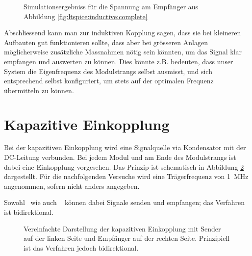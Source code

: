 
\begin{figure}[h!tb]
    
    \caption[Simulationsergebniss induktive Einkopplung bei Resonanz]{%
        Simulationsergebniss f\"ur die Spannung am Empf\"anger aus Abbildung
        \ref{fig:ltspice:inductive:complete}%
    }
    \label{fig:simu:inductive:resonance}
\end{figure}


Abschliessend kann man  zur induktiven Kopplung sagen, dass  sie bei kleineren
Aufbauten  gut  funktionieren  sollte,   dass  aber  bei  gr\"osseren  Anlagen
m\"oglicherweise  zus\"atzliche  Massnahmen  n\"otig sein  k\"onnten,  um  das
Signal klar empfangen und auswerten  zu k\"onnen. Dies k\"onnte z.B. bedeuten,
dass  unser System  die Eigenfrequenz  des Modulstrangs  selbst ausmisst,  und
sich entsprechend  selbst konfiguriert,  um stets  auf der  optimalen Frequenz
\"ubermitteln zu k\"onnen.


\clearpage
\section{Kapazitive Einkopplung}
\label{sec:simu:coupling:capacitive}

Bei der  kapazitiven Einkopplung  wird eine  Signalquelle via  Kondensator mit
der  DC-Leitung  verbunden. Bei  jedem  Modul und  am  Ende  des  Modulstrangs
ist   dabei  eine   Einkopplung   vorgesehen. Das   Prinzip  ist   schematisch
in   Abbildung   \ref{fig:circ:coupling:capacitive}   dargestellt. F\"ur   die
nachfolgenden  Versuche  wird  eine Tr\"agerfrequenz  von  \SI{1}{\mega\hertz}
angenommen, sofern nicht anders angegeben.

Sowohl \Master ~wie auch \Sensor~ k\"onnen dabei Signale senden und empfangen;
das Verfahren ist bidirektional.

\begin{figure}[h!tb]
    \centering
    
    \caption[Ersatzschaltbild kapazitive Einkopplung]{%
        Vereinfachte Darstellung  der kapazitiven  Einkopplung mit  Sender auf
        der linken  Seite und  Empf\"anger auf der  rechten Seite. Prinzipiell
        ist das Verfahren jedoch bidirektional.%
    }
    \label{fig:circ:coupling:capacitive}
\end{figure}

